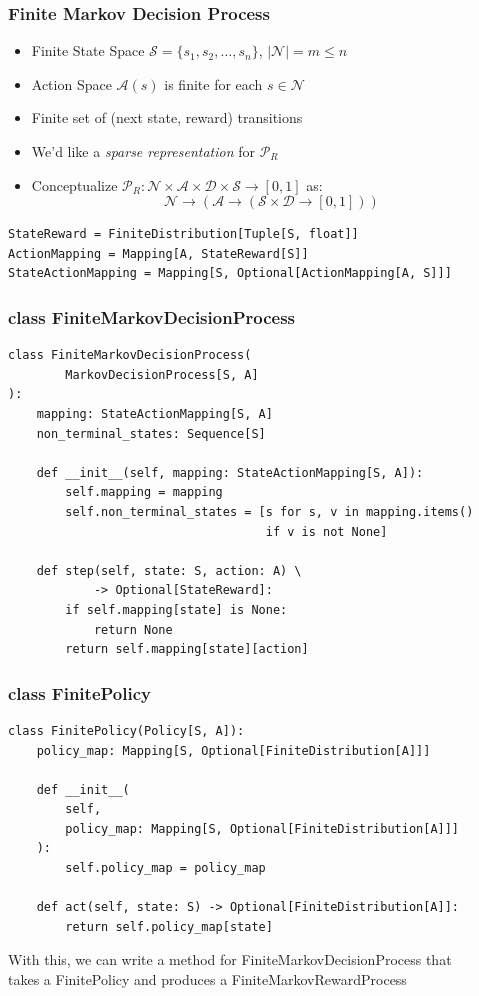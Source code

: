 \documentclass[handout]{beamer}
\begin{document}
\begin{frame}[fragile]
\frametitle{Finite Markov Decision Process}
\pause
\begin{itemize}[<+->]
\item Finite State Space $\mathcal{S} = \{s_1, s_2, \ldots, s_n\}$, $|\mathcal{N}| = m\leq n$
\item Action Space $\mathcal{A}(s)$ is finite for each $s \in \mathcal{N}$
\item Finite set of (next state, reward) transitions
\item We'd like a {\em sparse representation} for $\mathcal{P}_R$
\item Conceptualize $\mathcal{P}_R : \mathcal{N} \times \mathcal{A} \times \mathcal{D} \times \mathcal{S} \rightarrow [0, 1]$ as:
$$\mathcal{N} \rightarrow (\mathcal{A} \rightarrow (\mathcal{S} \times \mathcal{D} \rightarrow [0, 1]))$$
\end{itemize}
\pause
\begin{lstlisting}
StateReward = FiniteDistribution[Tuple[S, float]]
ActionMapping = Mapping[A, StateReward[S]]
StateActionMapping = Mapping[S, Optional[ActionMapping[A, S]]]
\end{lstlisting}
\end{frame}


\begin{frame}[fragile]
\frametitle{class FiniteMarkovDecisionProcess}
\pause
\begin{lstlisting}
class FiniteMarkovDecisionProcess(
        MarkovDecisionProcess[S, A]
):
    mapping: StateActionMapping[S, A]
    non_terminal_states: Sequence[S]

    def __init__(self, mapping: StateActionMapping[S, A]):
        self.mapping = mapping
        self.non_terminal_states = [s for s, v in mapping.items()
                                    if v is not None]

    def step(self, state: S, action: A) \
            -> Optional[StateReward]:
        if self.mapping[state] is None:
            return None
        return self.mapping[state][action]                                
\end{lstlisting}                                    
\end{frame}

\begin{frame}[fragile]
\frametitle{class FinitePolicy}
\pause
\begin{lstlisting}
class FinitePolicy(Policy[S, A]):
    policy_map: Mapping[S, Optional[FiniteDistribution[A]]]

    def __init__(
        self,
        policy_map: Mapping[S, Optional[FiniteDistribution[A]]]
    ):
        self.policy_map = policy_map

    def act(self, state: S) -> Optional[FiniteDistribution[A]]:
        return self.policy_map[state]                           
\end{lstlisting}

With this, we can write a method for FiniteMarkovDecisionProcess that \\
takes a FinitePolicy and produces a FiniteMarkovRewardProcess                                 
\end{frame}
\end{document}
